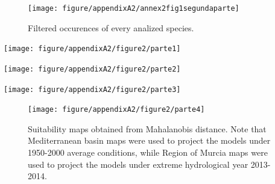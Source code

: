 \documentclass[11pt,twoside]{reedthesis}
\begin{document}
\setlength{\textfloatsep}{-10pt plus 1.0pt minus 2.0pt}
\begin{figure}[hbt!]

{\centering \texttt{[image: figure/appendixA2/annex2fig1segundaparte]} 

}

\caption[ Filtered occurences of analized species]{ Filtered occurences of every analized species.}\label{fig:apa212}
\end{figure}
\newpage
\begin{landscape}
\begin{center}\texttt{[image: figure/appendixA2/figure2/parte1]} \end{center}

\begin{center}\texttt{[image: figure/appendixA2/figure2/parte2]} \end{center}

\begin{center}\texttt{[image: figure/appendixA2/figure2/parte3]} \end{center}
\setlength{\textfloatsep}{-10pt plus 1.0pt minus 2.0pt}

\setlength{\abovecaptionskip}{15pt}
\begin{figure}[hbt!]

{\centering \texttt{[image: figure/appendixA2/figure2/parte4]} 

}

\caption[Suitability maps obtained from Mahalanobis distance]{Suitability maps obtained from Mahalanobis distance. Note that Mediterranean basin maps were used to project the models under 1950-2000 average conditions, while Region of Murcia maps were used to project the models under extreme hydrological year 2013-2014.}\label{fig:apa224}
\end{figure}
\setlength{\abovecaptionskip}{0pt}

\newpage
\end{landscape}
\newpage
\end{document}
